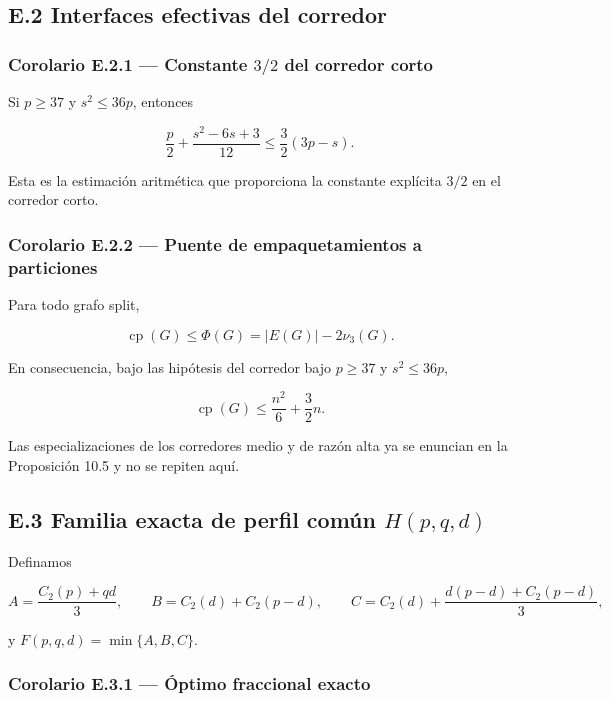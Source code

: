 \documentclass[spanish,11pt,a4paper]{article}
\begin{document}
\subsection{E.2 Interfaces efectivas del
corredor}\label{e.2-interfaces-efectivas-del-corredor}

\subsubsection{\texorpdfstring{Corolario E.2.1 --- Constante \(3/2\) del
corredor
corto}{Corolario E.2.1 --- Constante 3/2 del corredor corto}}\label{corolario-e.2.1-constante-32-del-corredor-corto}

Si \(p\ge37\) y \(s^2\le36p\), entonces

\[\frac p2+\frac{s^2-6s+3}{12}\le\frac32(3p-s).\]

Esta es la estimación aritmética que proporciona la constante explícita
\(3/2\) en el corredor corto.

\subsubsection{Corolario E.2.2 --- Puente de empaquetamientos a
particiones}\label{corolario-e.2.2-puente-de-empaquetamientos-a-particiones}

Para todo grafo split,

\[\operatorname{cp}(G)\le \Phi(G)=|E(G)|-2\nu_3(G).\]

En consecuencia, bajo las hipótesis del corredor bajo \(p\ge37\) y
\(s^2\le36p\),

\[\operatorname{cp}(G)\le \frac{n^2}{6}+\frac32n.\]

Las especializaciones de los corredores medio y de razón alta ya se
enuncian en la Proposición 10.5 y no se repiten aquí.

\subsection{\texorpdfstring{E.3 Familia exacta de perfil común
\(H(p,q,d)\)}{E.3 Familia exacta de perfil común H(p,q,d)}}\label{e.3-familia-exacta-de-perfil-comuxfan-hpqd}

Definamos

\[A=\frac{C_2(p)+qd}{3},\qquad B=C_2(d)+C_2(p-d),\qquad C=C_2(d)+\frac{d(p-d)+C_2(p-d)}{3},\]

y \(F(p,q,d)=\min\{A,B,C\}\).

\subsubsection{Corolario E.3.1 --- Óptimo fraccional
exacto}\label{corolario-e.3.1-uxf3ptimo-fraccional-exacto}
\end{document}

